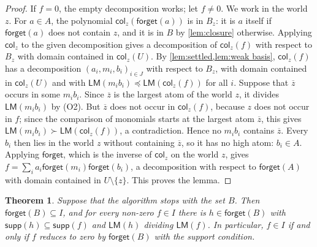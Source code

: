 \documentclass[12pt,a4paper,article]{memoir}
\newcommand{\supp}{\mathsf{supp}}
\newcommand{\LM}{\mathsf{LM}}
\newcommand{\hi}[1]{\overline{#1}}
\newcommand{\col}{\mathsf{col}}
\newcommand{\forget}{\mathsf{forget}}
\newtheorem{theorem}{Theorem}
\theoremstyle{definition}
\begin{document}
\begin{proof}
If $f = 0$, the empty decomposition works; let $f \neq 0$.
We work in the world $z$.
For $a \in A$, the polynomial $\col_z(\forget(a))$ is in $B_z$:
it is $a$ itself if $\forget(a)$ does not contain $z$, and it is in $B$ by \cref{lem:closure} otherwise.
Applying $\col_z$ to the given decomposition gives a decomposition of $\col_z(f)$ with respect to $B_z$
with domain contained in $\col_z(U)$.
By \cref{lem:settled,lem:weak basis}, $\col_z(f)$ has a decomposition $(a_i, m_i, b_i)_{i \in J}$ with respect to $B_z$,
with domain contained in $\col_z(U)$ and with $\LM(m_i b_i) \preceq \LM(\col_z(f))$ for all $i$.
Suppose that $\hi{z}$ occurs in some $m_i b_i$.
Since $\hi{z}$ is the largest atom of the world $z$, it divides $\LM(m_i b_i)$ by (O2).
But $\hi{z}$ does not occur in $\col_z(f)$, because $z$ does not occur in $f$;
since the comparison of monomials starts at the largest atom $\hi{z}$, this gives $\LM(m_i b_i) \succ \LM(\col_z(f))$,
a contradiction.
Hence no $m_i b_i$ contains $\hi{z}$.
Every $b_i$ then lies in the world $z$ without containing $\hi{z}$, so it has no high atom: $b_i \in A$.
Applying $\forget$, which is the inverse of $\col_z$ on the world $z$, gives
$f = \sum_i a_i \forget(m_i) \forget(b_i)$, a decomposition with respect to $\forget(A)$
with domain contained in $U \setminus \{z\}$. This proves the lemma.
\end{proof}

\begin{theorem}\label{thm:one colour}
Suppose that the algorithm stops with the set $B$. Then $\forget(B) \subseteq I$,
and for every non-zero $f \in I$ there is $h \in \forget(B)$ with $\supp(h) \subseteq \supp(f)$
and $\LM(h)$ dividing $\LM(f)$.
In particular, $f \in I$ if and only if $f$ reduces to zero by $\forget(B)$ with the support condition.
\end{theorem}
\end{document}
